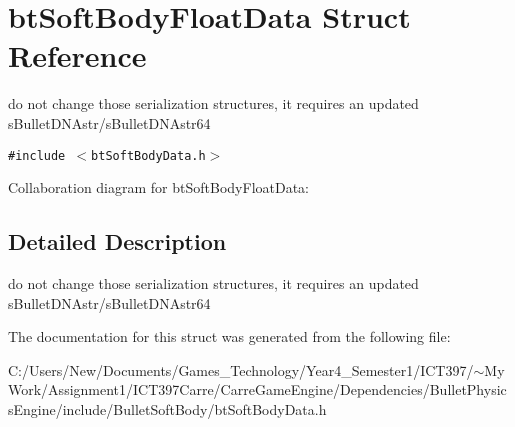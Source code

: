\hypertarget{structbt_soft_body_float_data}{
\section{btSoftBodyFloatData Struct Reference}
\label{structbt_soft_body_float_data}
}
do not change those serialization structures, it requires an updated sBulletDNAstr/sBulletDNAstr64  


{\tt \#include $<$btSoftBodyData.h$>$}

Collaboration diagram for btSoftBodyFloatData:

\subsection{Detailed Description}
do not change those serialization structures, it requires an updated sBulletDNAstr/sBulletDNAstr64 

The documentation for this struct was generated from the following file:\begin{CompactItemize}
\item 
C:/Users/New/Documents/Games\_\-Technology/Year4\_\-Semester1/ICT397/$\sim$My Work/Assignment1/ICT397Carre/CarreGameEngine/Dependencies/BulletPhysicsEngine/include/BulletSoftBody/btSoftBodyData.h\end{CompactItemize}
